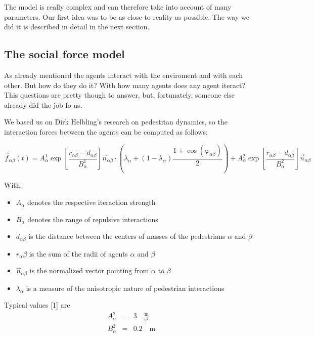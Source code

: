\documentclass[11pt]{article}
\begin{document}
The model is really complex and can therefore take into account of many parameters. Our first idea was to be as close to reality as possible. The way we did it is described in detail in the next section.

\subsection{The social force model}

As already mentioned the agents interact with the enviroment and with each other. But how do they do it?  With how many agents does any agent iteract? This questions are pretty though to answer, but, fortunately, someone else already did the job fo us.

We based us on Dirk Helbling's research on pedestrian dynamics, so the interaction forces between the agents can be computed as follows:

\begin{equation*}
	\vec{f}_{\alpha\beta}(t) = A_\alpha^1\exp\left[\frac{r_{\alpha\beta} - d_{\alpha\beta}}{B_\alpha^1}\right]\vec{n}_{\alpha\beta}\cdot\left(\lambda_\alpha+(1-\lambda_\alpha)\frac{1+\cos(\varphi_{\alpha\beta})}{2}\right)+A_\alpha^2\exp\left[\frac{r_{\alpha\beta}-d_{\alpha\beta}}{B_\alpha^2}\right]\vec{n}_{\alpha\beta}
\end{equation*}

With:
\begin{itemize}
	\item $A_\alpha$ denotes the respective iteraction strength
	\item $B_\alpha$ denotes the range of repulsive interactions
	\item $d_{\alpha\beta}$ is the distance between the centers of masses of the pedestrians $\alpha$ and $\beta$
	\item $r_\alpha\beta$ is the sum of the radii of agents $\alpha$ and $\beta$
	\item $\vec{n}_{\alpha\beta}$ is the normalized vector pointing from $\alpha$ to $\beta$
	\item $\lambda_\alpha$ is a measure of the anisotropic nature of pedestrian interactions
\end{itemize}

Typical values [1] are
\begin{eqnarray*}
	A_\alpha^2 & = & 3 \quad\frac{\text{m}}{\text{s}^2}\\
	B_\alpha^2 & = & 0.2 \quad\text{m}\\
\end{eqnarray*}
\end{document}
